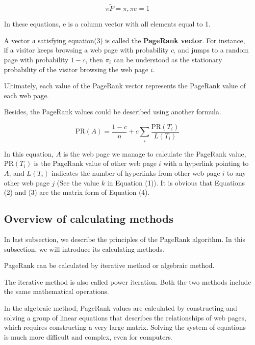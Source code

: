 \documentclass[lettersize,journal,12pt,conference]{IEEEtran}
\begin{document}
\begin{equation}
	\label{eq:3}
	\pi \widetilde{P} = \pi , \pi e = 1
\end{equation}

In these equations, e is a column vector with all elements equal to 1.

A vector π satisfying equation(3) is called the \textbf{PageRank vector}. For instance, if a visitor keeps browsing a web page with probability $c$, and jumps to a random page with probability $1 - c$, then $\pi_i$ can be understood as the stationary probability of the visitor browsing the web page $i$.

Ultimately, each value of the PageRank vector represents the PageRank value of each web page.

Besides, the PageRank values could be described using another formula.

\begin{equation}
	\label{eq:4}
	\text{PR}(A) = \frac{1 - c}{n} + c \sum_{i} \frac{\text{PR}(T_i)}{L(T_i)}
\end{equation}

In this equation, $A$ is the web page we manage to calculate the PageRank value,  $\text{PR}(T_i)$ is the PageRank value of other web page $i$ with a hyperlink pointing to $A$, and $L(T_i)$ indicates the number of hyperlinks from other web page $i$  to any other web page $j$ (See the value $k$ in Equation (1)). It is obvious that Equations (2) and (3) are the matrix form of Equation (4).

\subsection{Overview of calculating methods}

In last subsection, we describe the principles of the PageRank algorithm. In this subsection, we will introduce its calculating methods.

PageRank can be calculated by iterative method or algebraic method.

The iterative method is also called power iteration. Both the two methods include the same mathematical operations.

In the algebraic method, PageRank values are calculated by constructing and solving a group of linear equations that describes the relationships of web pages, which requires constructing a very large matrix. Solving the system of equations is much more difficult and complex, even for computers.
\end{document}
